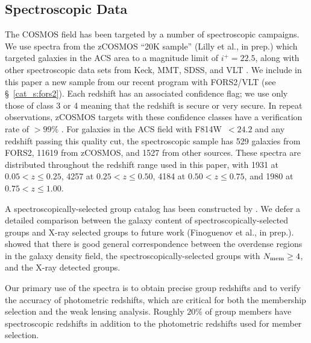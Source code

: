 \subsection{Spectroscopic Data}
\label{cat_s:spectroscopy}

The COSMOS field has been targeted by a number of spectroscopic
campaigns. We use spectra from the zCOSMOS
``20K sample'' (Lilly et al., in prep.) which targeted galaxies in the ACS area to a
magnitude limit of $i^{+}=22.5$, along with other spectroscopic data
sets from Keck, MMT, SDSS, and VLT \citep{Prescott2006, Capak2010}. We
include in this paper a new sample from our 
recent program with FORS2/VLT (see \S~\ref{cat_s:fors2}). Each redshift has
an associated confidence flag; we use only those of class 3 or 4 meaning that the
redshift is secure or very secure. In repeat observations, zCOSMOS
targets with these confidence classes have a verification rate of
$>99\%$ \citep{Lilly2007}. For galaxies in the ACS field with F814W~$<24.2$ and any
redshift passing this quality cut, the spectroscopic sample has 529
galaxies from FORS2, 11619 from zCOSMOS, and 1527 from 
other sources. These spectra are distributed throughout the redshift
range used in this paper, with 1931 at $0.05<z\le0.25$, 4257 at
$0.25<z\le0.50$, 4184 at $0.50<z\le0.75$, and 1980 at
$0.75<z\le1.00$.

A spectroscopically-selected group catalog has been constructed by
\citet{Knobel2009}. We defer a detailed comparison between the
galaxy content of spectroscopically-selected groups and X-ray selected
groups to future work (Finoguenov et al., in prep.). \citet{Kovac2010a}
showed that there is good general correspondence between the overdense
regions in the galaxy density field, the spectroscopically-selected
groups with $N_{\rm mem}\ge4$, and the X-ray detected groups.

Our primary use of the spectra is to obtain precise group redshifts and to
verify the accuracy of photometric redshifts, which are critical for
both the membership selection and the weak lensing analysis. Roughly
$20\%$ of group members have spectroscopic redshifts in addition to
the photometric redshifts used for member selection. 

